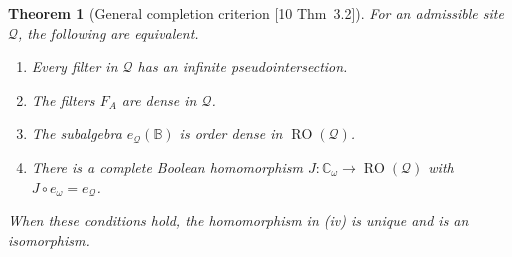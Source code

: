 \documentclass[11pt,letterpaper]{article}
\newtheorem{theorem}{Theorem}[section]
\theoremstyle{definition}
\theoremstyle{remark}
\newcommand{\om}{\omega}
\newcommand{\B}{\mathbb B}
\newcommand{\C}{\mathbb C}
\newcommand{\RO}{\operatorname{RO}}
\newcommand{\cQ}{\mathcal Q}
\newcommand{\src}[1]{\textup{[#1]}}
\begin{document}
\begin{theorem}[General completion criterion \src{10 Thm~3.2}]
\label{fbc:thm:criterion}
For an admissible site $\cQ$, the following are equivalent.
\begin{enumerate}[label=\textup{(\roman*)}]
\item Every filter in $\cQ$ has an infinite pseudointersection.
\item The filters $F_A$ are dense in $\cQ$.
\item The subalgebra $e_\cQ(\B)$ is order dense in $\RO(\cQ)$.
\item There is a complete Boolean homomorphism $J:\C_\om\to\RO(\cQ)$
with $J\circ e_\om=e_\cQ$.
\end{enumerate}
When these conditions hold, the homomorphism in \textup{(iv)} is unique
and is an isomorphism.
\end{theorem}
\end{document}
